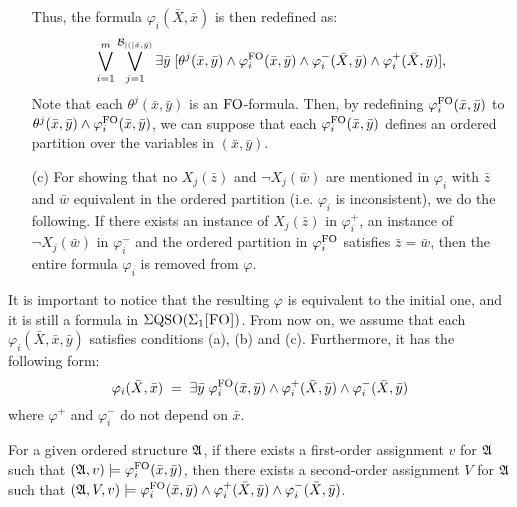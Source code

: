 \begin{itemize}
	Thus, the formula $\varphi_i(\bar{X},\bar{x})$ is then redefined as:
	$$
	\bigvee_{i = 1}^m \bigvee_{j = 1}^{\mathcal{B}_{\vert ( \vert\bar{x},\bar{y})}} \exists \bar{y} \; [\theta^j(\bar{x},\bar{y})\wedge \varphi_i^{{\rm FO}}(\bar{x},\bar{y}) \wedge \varphi_i^{-}(\bar{X},\bar{y}) \wedge \varphi_i^{+}(\bar{X},\bar{y})],
	$$
	Note that each $\theta^j(\bar{x},\bar{y})$ is an ${\rm FO}$-formula.
	Then, by redefining $\varphi_i^{{\rm FO}}(\bar{x},\bar{y})$  to $\theta^j(\bar{x},\bar{y})\wedge \varphi_i^{{\rm FO}}(\bar{x},\bar{y})$, we can suppose that each $\varphi_i^{{\rm FO}}(\bar{x},\bar{y})$ defines an ordered partition over the variables in $(\bar{x},\bar{y})$.
	\item[(c)] For showing that no $X_j(\bar{z})$ and $\neg X_j(\bar{w})$ are mentioned in $\varphi_i$ with $\bar{z}$ and $\bar{w}$ equivalent in the ordered partition (i.e. $\varphi_i$ is inconsistent), we do the following. If there exists an instance of $X_j(\bar{z})$ in $\varphi^{+}_i$, an instance of $\neg X_j(\bar{w})$ in $\varphi^{-}_i$ and the ordered partition in $\varphi^{{\rm FO}}_i$ satisfies $\bar{z} = \bar{w}$, then the entire formula $\varphi_i$ is removed from $\varphi$.
\end{itemize}
It is important to notice that the resulting $\varphi$ is equivalent to the initial one, and it is still a formula in $\Sigma{\rm QSO}(\Sigma_{1}\textsc{[FO]})$. From now on, we assume that each $\varphi_i(\bar{X},\bar{x},\bar{y})$ satisfies conditions (a), (b) and (c). Furthermore, it has the following form:
$$
\varphi_i(\bar{X},\bar{x}) \; = \; \exists{\bar{y}} \; \varphi^{{\rm FO}}_i(\bar{x},\bar{y}) \wedge \varphi^{+}_i(\bar{X}, \bar{y}) \wedge \varphi^{-}_i(\bar{X},\bar{y}) 
$$
where $\varphi^{+}$ and $\varphi^{-}_i$ do not depend on  $\bar{x}$.
\begin{claim}\label{claim:minusone}
For a given ordered structure $\mathfrak{A}$, if there exists a first-order assignment $v$ for $\mathfrak{A}$ such that $(\mathfrak{A},v)\models\varphi^{{\rm FO}}_i(\bar{x},\bar{y})$, then there exists a second-order assignment $V$ for $\mathfrak{A}$ such that  $(\mathfrak{A},V,v)\models \varphi^{{\rm FO}}_i(\bar{x},\bar{y}) \wedge \varphi^{+}_i(\bar{X}, \bar{y}) \wedge \varphi^{-}_i(\bar{X},\bar{y})$.
\end{claim}
